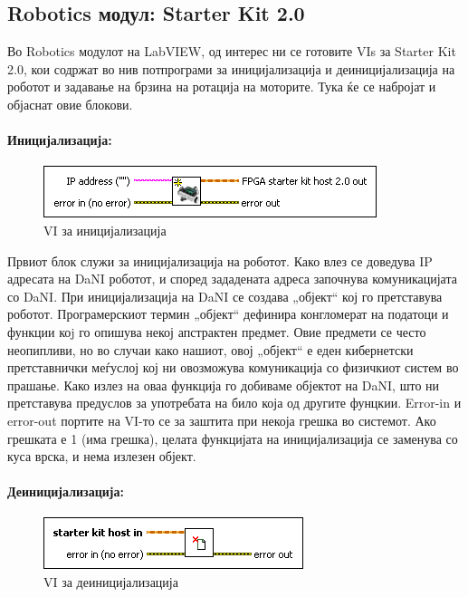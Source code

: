 \documentclass[12pt]{article}
\begin{document}
  \subsection{Robotics модул: Starter Kit 2.0}
    Во Robotics модулот на LabVIEW, од интерес ни се готовите VIs за Starter Kit 2.0, кои содржат во нив потпрограми за иницијализација и деиницијализација на роботот и задавање на брзина на ротација на моторите. Тука ќе се набројат и објаснат овие блокови.

		\paragraph{Иницијализација:\\}

			\begin{figure}[h]
				\includegraphics[width=0.45\linewidth]{./images/init.png}
				\raggedright
				\caption{VI за иницијализација}
				\label{fig:init.png}
				\end{figure}

		  Првиот блок служи за иницијализација на роботот. Како влез се доведува IP адресата на DaNI роботот, и според зададената адреса започнува комуникацијата со DaNI. При иницијализација на DaNI се создава „објект“ кој го претставува роботот. Програмерскиот термин „објект“ дефинира конгломерат на податоци и функции коj го опишува некој апстрактен предмет. Овие предмети се често неопипливи, но во случаи како нашиот, овој „објект“ е еден кибернетски претставнички меѓуслој кој ни овозможува комуникација со физичкиот систем во прашање. Како излез на оваа функција го добиваме објектот на DaNI, што ни претставува предуслов за употребата на било која од другите фунцкии. Error-in и error-out портите на VI-то се за заштита при некоја грешка во системот. Ако грешката е 1 (има грешка), целата функцијата на иницијализација се заменува со куса врска, и нема излезен објект. \\

    \paragraph{Деиницијализација:\\}
			\begin{figure}[h]
				\includegraphics[width = 0.45\linewidth]{./images/deinit.png}
				\raggedright
				\caption{VI за деиницијализација}
				\label{fig:deinit.png}
				\end{figure}
\end{document}
